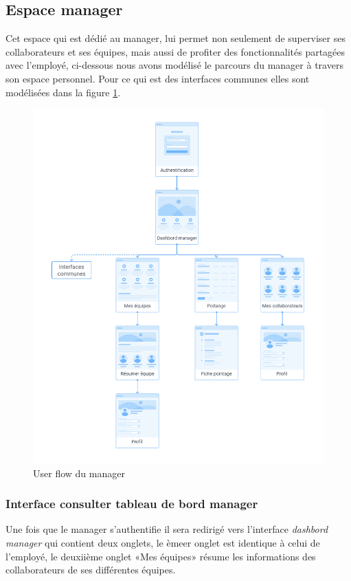 \clearpage

\subsection{Espace manager}
Cet espace qui est dédié au manager, lui permet non seulement de superviser ses
collaborateurs et ses équipes, mais aussi de profiter des fonctionnalités
partagées avec l’employé, ci-dessous nous avons modélisé le parcours du manager
à travers son espace personnel. Pour ce qui est des interfaces communes elles
sont modélisées dans la figure \ref{fig95}.

\begin{figure}[h!]
    \vspace{-10pt}
    \centering
    \includegraphics[scale=0.38 ]{images/interface/Espace manager.png}
    \vspace{-30pt}
    \caption{User flow du manager}
    \label{fig95}
\end{figure}

\clearpage

\subsubsection*{Interface consulter tableau de bord manager}
Une fois que le manager s'authentifie il sera redirigé vers l’interface
\emph{dashbord manager} qui contient deux onglets, le èmeer onglet est identique
à celui de l’employé, le deuxiième onglet «Mes équipes» résume les informations
des collaborateurs de ses différentes équipes. 


